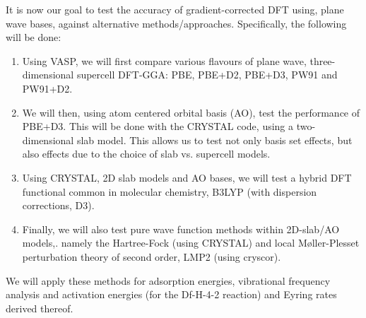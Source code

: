\documentclass[11pt,DIV=13,BCOR=5mm,a4paper,headinclude]{scrbook}
\begin{document}
It is now our goal to test the accuracy of gradient-corrected DFT using, plane wave bases, against alternative methods/approaches.
Specifically, the following will be done:
\begin{enumerate}
\item Using VASP, we will first compare various flavours of plane wave, three-dimensional supercell DFT-GGA: PBE, PBE+D2, PBE+D3, PW91 and PW91+D2.
\item We will then, using atom centered orbital basis (AO), test the performance of PBE+D3.
This will be done with the CRYSTAL code, using a two-dimensional slab model.
This allows us to test not only basis set effects, but also effects due to the choice of slab vs. supercell models.
\item Using CRYSTAL, 2D slab models and AO bases, we will test a hybrid DFT functional common in molecular chemistry, B3LYP (with dispersion corrections, D3).
\item Finally, we will also test pure wave function methods within 2D-slab/AO models,. namely the Hartree-Fock (using CRYSTAL) and local M\o{}ller-Plesset perturbation theory of second order, LMP2 (using cryscor).
\end{enumerate}
We will apply these methods for adsorption energies, vibrational frequency analysis and activation energies (for the Df-H-4-2 reaction) and Eyring rates derived thereof.

\end{document}
